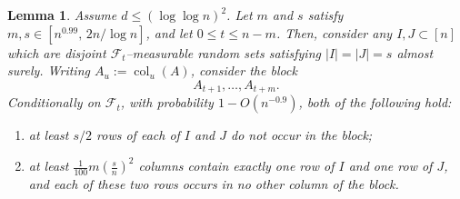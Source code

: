 \documentclass[reqno,english]{amsart}
\newcommand*{\calF}{\mathcal F}
\newcommand*{\col}{\operatorname{col}}
\newtheorem{lemma}[lemma]{Lemma}
\theoremstyle{definition}
\begin{document}
\begin{lemma}\label{lem:block-estimate}
Assume $d\le(\log\log n)^2$. Let $m$ and $s$ satisfy $m,s \in [n^{0.99},\, 2n/\log n]$, and let $0\le t\le n-m$. Then, consider any $I,J \subset [n]$ which are disjoint
$\calF_t$--measurable random sets satisfying $|I|=|J|=s$ almost surely. Writing $A_u:=\col_u(A)$, consider the block
$$
    A_{t+1},\ldots,A_{t+m}.
$$
Conditionally on $\calF_t$, with probability $1-O(n^{-0.9})$, both of the
following hold:
\begin{enumerate}
\item at least $s/2$ rows of each of $I$ and $J$ do not occur in the
block;
\item at least
\(        \frac1{100}m\left(\frac{s}{n}\right)^2
   \)
columns contain exactly one row of $I$ and one row of $J$, and each of
these two rows occurs in no other column of the block.
\end{enumerate}
\end{lemma}
\end{document}
